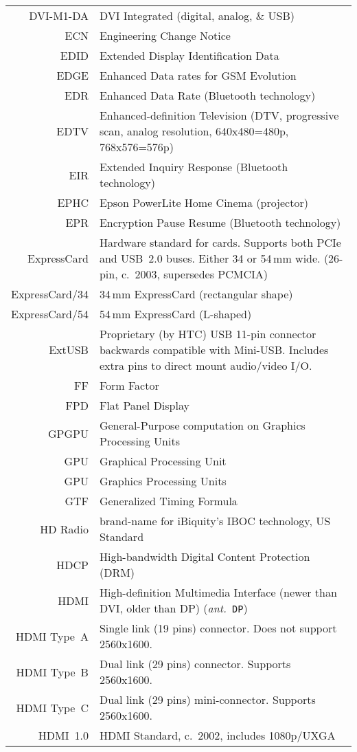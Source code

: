 \documentclass[12pt,twoside]{article}
\newcommand{\ant}[1]{(\textit{ant.}~\texttt{#1})}
\begin{document}
\begin{longtable}[>{\bfseries}l]{>{\ttfamily}r l}
DVI-M1-DA & DVI Integrated (digital, analog, \& USB) \\
ECN & Engineering Change Notice \\
EDID & Extended Display Identification Data \\
EDGE & Enhanced Data rates for GSM Evolution \\
EDR & Enhanced Data Rate (Bluetooth technology) \\
EDTV & Enhanced-definition Television (DTV, progressive scan, analog resolution, 640x480=480p, 768x576=576p) \\
EIR & Extended Inquiry Response (Bluetooth technology) \\
EPHC & Epson PowerLite Home Cinema (projector) \\
EPR & Encryption Pause Resume (Bluetooth technology) \\
ExpressCard & Hardware standard for cards. Supports both PCIe and USB~2.0 buses. Either 34 or 54\,mm wide. (26-pin, c.~2003, supersedes PCMCIA) \\ 
ExpressCard/34 & 34\,mm ExpressCard (rectangular shape)\\ 
ExpressCard/54 & 54\,mm ExpressCard (L-shaped) \\ 
ExtUSB & Proprietary (by HTC) USB 11-pin connector backwards compatible with Mini-USB. Includes extra pins to direct mount audio/video I/O. \\
FF & Form Factor \\
FPD & Flat Panel Display \\
GPGPU & General-Purpose computation on Graphics Processing Units \\
GPU & Graphical Processing Unit \\
GPU & Graphics Processing Units \\
GTF & Generalized Timing Formula \\
HD Radio & brand-name for iBiquity's IBOC technology, US Standard \\
HDCP & High-bandwidth Digital Content Protection (DRM) \\
HDMI & High-definition Multimedia Interface (newer than DVI, older than DP) \ant{DP} \\
HDMI Type~A & Single link (19 pins) connector. Does not support 2560x1600. \\
HDMI Type~B & Dual link (29 pins) connector. Supports 2560x1600. \\
HDMI Type~C & Dual link (29 pins) mini-connector. Supports 2560x1600. \\
HDMI~1.0 & HDMI Standard, c.~2002, includes 1080p/UXGA \\

\end{longtable}
\end{document}
